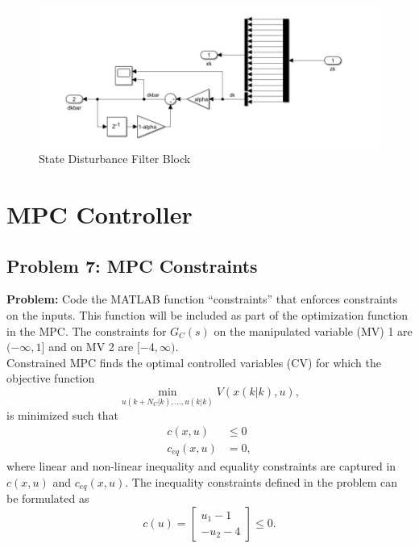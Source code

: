 \documentclass[12pt]{article}
\begin{document}
\begin{figure}[H]
	\includegraphics[width=15cm]{StateDisturbanceFilter.jpg}
	\centering
	\caption{State Disturbance Filter Block}
	\label{fig:StateDisturbanceFilter}
\end{figure}

\section{MPC Controller}

\subsection{Problem 7: MPC Constraints}

\textbf{Problem:} Code the MATLAB function “constraints” that enforces constraints on the inputs. This function will be included as part of the optimization function in the MPC. The constraints for $G_C(s)$ on the manipulated variable (MV) 1 are $(-\infty, 1]$ and on MV 2 are $[-4, \infty)$. \\

Constrained MPC finds the optimal controlled variables (CV) for which the objective function
\begin{equation}
\min_{u(k+N_C|k),...,u(k|k)} V(x(k|k),u),
\end{equation}
is minimized such that
\begin{subequations}
\begin{align}
c(x,u) &\leq 0 \\
c_{eq}(x,u) &= 0,
\end{align}
\end{subequations}
where linear and non-linear inequality and equality constraints are captured in $c(x,u)$ and $c_{eq}(x,u)$. The inequality constraints defined in the problem can be formulated as
\begin{equation}
c(u) = \begin{bmatrix}
u_1 - 1 \\
-u_2 - 4
\end{bmatrix} \leq 0. \label{eq:constraints}
\end{equation}
\end{document}
